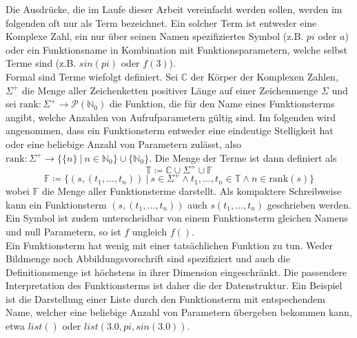 \documentclass{article}
\begin{document}
Die Ausdrücke, die im Laufe dieser Arbeit vereinfacht werden sollen, werden im folgenden oft nur als Term bezeichnet. Ein solcher Term ist entweder eine Komplexe Zahl, ein nur über seinen Namen spezifiziertes Symbol (z.B. $pi$ oder $a$) oder ein Funktionsname in Kombination mit Funktionsparametern, welche selbst Terme sind (z.B. $sin(pi)$ oder $f(3)$). \\
Formal sind Terme wiefolgt definiert. Sei $\mathbb{C}$ der Körper der Komplexen Zahlen, $\Sigma^+$ die Menge aller Zeichenketten positiver Länge auf einer Zeichenmenge $\Sigma$ und sei $\text{rank} \colon \Sigma^+ \rightarrow \mathcal{P}(\mathbb{N}_0)$ die Funktion, die für den Name eines Funktionsterms angibt, welche Anzahlen von Aufrufparametern gültig sind. Im folgenden wird angenommen, dass ein Funktionsterm entweder eine eindeutige Stelligkeit hat oder eine beliebige Anzahl von Parametern zulässt, also 
$\text{rank} \colon \Sigma^+ \rightarrow \{\{n\}~|~n \in \mathbb{N}_0\} \cup \{\mathbb{N}_0\}$. 
Die Menge der Terme ist dann definiert als 
$$\mathbb{T} \coloneqq \mathbb{C} \cup \Sigma^+ \cup \mathbb{F}$$
$$\mathbb{F} \coloneqq \{(s, (t_1, \dots, t_n)) ~|~ s \in \Sigma^+ \land t_1, \dots, t_n \in \mathbb{T} \land n \in \text{rank}(s)\}$$
wobei $\mathbb{F}$ die Menge aller Funktionsterme darstellt. Als kompaktere Schreibweise kann ein Funktionsterm $(s, (t_1, \dots, t_n))$ auch $s(t_1, \dots, t_n)$ geschrieben werden.
Ein Symbol ist zudem unterscheidbar von einem Funktionsterm gleichen Namens und null Parametern, so ist $f$ ungleich $f()$.\\
Ein Funktionsterm hat wenig mit einer tatsächlichen Funktion zu tun. Weder Bildmenge noch Abbildungsvorschrift sind spezifiziert und auch die Definitionsmenge ist höchstens in ihrer Dimension eingeschränkt. Die passendere Interpretation des Funktionsterms ist daher die der Datenstruktur. Ein Beispiel ist die Darstellung einer Liste durch den Funktionsterm mit entspechendem Name, welcher eine beliebige Anzahl von Parametern übergeben bekommen kann, etwa $list()$ oder $list(3.0, pi, sin(3.0))$.
\\~\\
\end{document}

